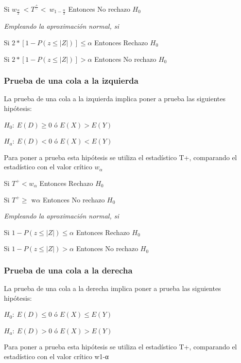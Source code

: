 \documentclass[]{book}
\theoremstyle{definition}
\theoremstyle{definition}
\theoremstyle{definition}
\theoremstyle{remark}
\begin{document}
Si
\(w_{\frac{\alpha}{2}}\  < T^{\frac{+}{-}} < \ w_{1 - \frac{\alpha}{2}}\)
Entonces No rechazo \(H_{0}\)

\emph{Empleando la aproximación normal, si}

Si
\(2*\left\lbrack 1 - P\left( z \leq \left| Z \right| \right) \right\rbrack \leq \alpha\)
Entonces Rechazo \(H_{0}\)

Si
\(2*\left\lbrack 1 - P\left( z \leq \left| Z \right| \right) \right\rbrack > \alpha\)
Entonces No rechazo \(H_{0}\)

\hypertarget{prueba-de-una-cola-a-la-izquierda-1}{%
\subsubsection{Prueba de una cola a la
izquierda}\label{prueba-de-una-cola-a-la-izquierda-1}}

La prueba de una cola a la izquierda implica poner a prueba las
siguientes hipótesis:

\(H_{0}:\ E\left( D \right) \geq 0\) ó \(E\left( X \right) > E(Y)\)

\(H_{a}:\ E(D) < 0\) ó \(E(X) < E(Y)\)

Para poner a prueba esta hipótesis se utiliza el estadístico T+,
comparando el estadístico con el valor crítico \(w_{\alpha}\)

Si \(T^{+} < w_{\alpha}\) Entonces Rechazo \(H_{0}\)

Si \(T^{+} \geq \text{\ w}\alpha\) Entonces No rechazo \(H_{0}\)

\emph{Empleando la aproximación normal, si}

Si \(1 - P\left( z \leq \left| Z \right| \right) \leq \alpha\) Entonces
Rechazo \(H_{0}\)

Si \(1 - P\left( z \leq \left| Z \right| \right) > \alpha\) Entonces No
rechazo \(H_{0}\)

\hypertarget{prueba-de-una-cola-a-la-derecha-1}{%
\subsubsection{Prueba de una cola a la
derecha}\label{prueba-de-una-cola-a-la-derecha-1}}

La prueba de una cola a la derecha implica poner a prueba las siguientes
hipótesis:

\(H_{0}:\ E\left( D \right) \leq 0\) ó \(E\left( X \right) \leq E(Y)\)

\(H_{a}:\ E(D) > 0\) ó \(E(X) > E(Y)\)

Para poner a prueba esta hipótesis se utiliza el estadístico T+,
comparando el estadístico con el valor crítico w1-α
\end{document}
